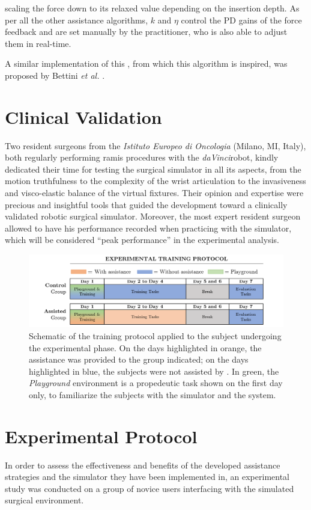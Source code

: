 \documentclass[../main.tex]{subfiles}
\begin{document}
scaling the force down to its relaxed value depending on the insertion depth. As per all the other assistance algorithms, $k$ and $\eta$ control the PD gains of the force feedback and are set manually by the practitioner, who is also able to adjust them in real-time.

A similar implementation of this \vf, from which this algorithm is inspired, was proposed by Bettini \textit{et al.} \cite{Bettini2004}.

\section{Clinical Validation}
\label{sec:clinicalvalidation}
Two resident surgeons from the \textit{Istituto Europeo di Oncologia} (Milano, MI, Italy), both regularly performing \ac{ramis} procedures with the \textit{daVinci}\cright robot, kindly dedicated their time for testing the surgical simulator in all its aspects, from the motion truthfulness to the complexity of the wrist articulation to the invasiveness and visco-elastic balance of the virtual fixtures. Their opinion and expertise were precious and insightful tools that guided the development toward a clinically validated robotic surgical simulator. 
Moreover, the most expert resident surgeon allowed to have his performance recorded when practicing with the simulator, which will be considered ``peak performance'' in the experimental analysis. 

\begin{figure}
    \centering
    \includegraphics[width=\textwidth]{images/training_protocol.png}
    \caption{Schematic of the training protocol applied to the subject undergoing the experimental phase. On the days highlighted in orange, the \vf assistance was provided to the group indicated; on the days highlighted in blue, the subjects were not assisted by \vfs. In green, the \textit{Playground} environment is a propedeutic task shown on the first day only, to familiarize the subjects with the simulator and the \davinci system.}
    \label{fig:trainingprotocol}
\end{figure}
\section{Experimental Protocol}
In order to assess the effectiveness and benefits of the developed assistance strategies and the simulator they have been implemented in, an experimental study was conducted on a group of novice users interfacing with the simulated surgical environment. 
\end{document}
